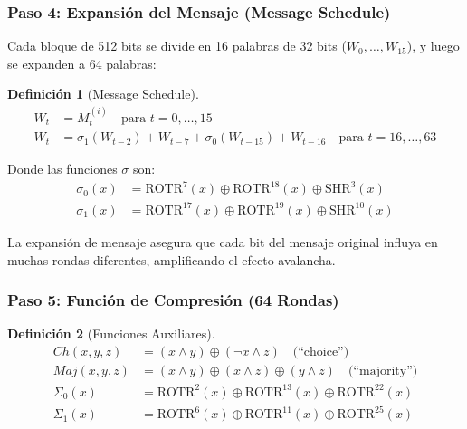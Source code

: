 \documentclass[11pt,a4paper,twoside,openright]{book}
\theoremstyle{definition}
\newtheorem{definition}{Definición}[chapter]
\theoremstyle{plain}
\theoremstyle{remark}
\begin{document}
\subsubsection{Paso 4: Expansión del Mensaje (Message Schedule)}

Cada bloque de 512 bits se divide en 16 palabras de 32 bits ($W_0, \ldots, W_{15}$), y luego se expanden a 64 palabras:

\begin{definition}[Message Schedule]
\begin{align}
W_t &= M_t^{(i)} \quad \text{para } t = 0, \ldots, 15 \\
W_t &= \sigma_1(W_{t-2}) + W_{t-7} + \sigma_0(W_{t-15}) + W_{t-16} \quad \text{para } t = 16, \ldots, 63
\end{align}

Donde las funciones $\sigma$ son:
\begin{align}
\sigma_0(x) &= \text{ROTR}^7(x) \oplus \text{ROTR}^{18}(x) \oplus \text{SHR}^3(x) \\
\sigma_1(x) &= \text{ROTR}^{17}(x) \oplus \text{ROTR}^{19}(x) \oplus \text{SHR}^{10}(x)
\end{align}
\end{definition}

\begin{intuicion}
La expansión de mensaje asegura que cada bit del mensaje original influya en muchas rondas diferentes, amplificando el efecto avalancha.
\end{intuicion}

\subsubsection{Paso 5: Función de Compresión (64 Rondas)}

\begin{definition}[Funciones Auxiliares]
\begin{align}
Ch(x, y, z) &= (x \land y) \oplus (\neg x \land z) \quad \text{(``choice'')} \\
Maj(x, y, z) &= (x \land y) \oplus (x \land z) \oplus (y \land z) \quad \text{(``majority'')} \\
\Sigma_0(x) &= \text{ROTR}^2(x) \oplus \text{ROTR}^{13}(x) \oplus \text{ROTR}^{22}(x) \\
\Sigma_1(x) &= \text{ROTR}^6(x) \oplus \text{ROTR}^{11}(x) \oplus \text{ROTR}^{25}(x)
\end{align}
\end{definition}
\end{document}
